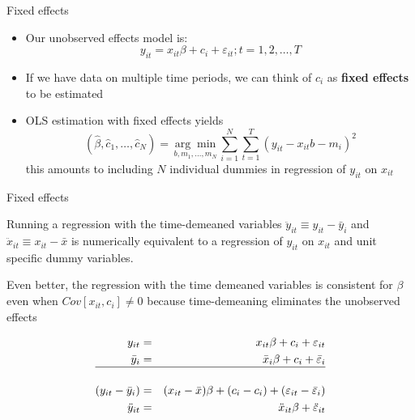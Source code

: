 \documentclass{beamer}
\begin{document}
\begin{frame}{Fixed effects}

	
	\begin{itemize}
	\item Our unobserved effects model is:$$y_{it} = x_{it}\beta + c_i + \varepsilon_{it}; t=1,2,\dots,T$$
	\item If we have data on multiple time periods, we can think of $c_i$ as \textbf{fixed effects} to be estimated
	\item OLS estimation with fixed effects yields$$(\widehat{\beta}, \widehat{c}_1, \dots, \widehat{c}_N) = \underset{b,m_1,\dots,m_N}{\arg\!\min} \sum_{i=1}^N\sum_{t=1}^T (y_{it} - x_{it}b - m_i)^2$$this amounts to including $N$ individual dummies in regression of $y_{it}$ on $x_{it}$
	\end{itemize}
\end{frame}

\begin{frame}{Fixed effects}
	
Running a regression with the time-demeaned variables $\ddot{y}_{it}\equiv y_{it} - \bar{y}_i$ and $\ddot{x}_{it} \equiv x_{it} - \bar{x}$ is numerically equivalent to a regression of $y_{it}$ on $x_{it}$ and unit specific dummy variables.

\vspace{10mm}

Even better, the regression with the time demeaned variables is consistent for $\beta$ even when $Cov[x_{it},c_i]\neq 0$ because time-demeaning eliminates the unobserved effects

\begin{eqnarray*}
y_{it} &=& x_{it}\beta + c_i + \varepsilon_{it} \\
\bar{y}_i &=& \bar{x}_i \beta + c_i + \bar{\varepsilon}_{i}\\
\hline \\
(y_{it} - \bar{y}_i) &=& (x_{it} - \bar{x})\beta + (c_i - c_i) + (\varepsilon_{it} - \bar{\varepsilon}_i) \\
\ddot{y}_{it} &=& \ddot{x}_{it}\beta + \ddot{\varepsilon}_{it}
\end{eqnarray*}

\end{frame}
\end{document}
